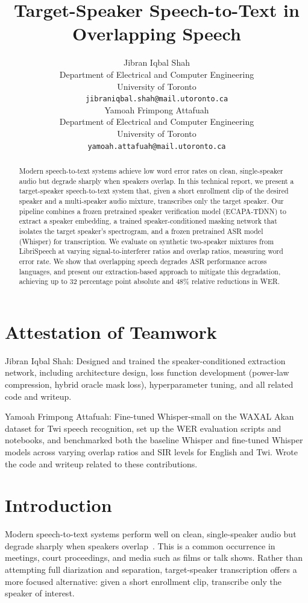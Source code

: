\documentclass{article}
\title{Target-Speaker Speech-to-Text in Overlapping Speech}
\author{%
  Jibran Iqbal Shah\\
  Department of Electrical and Computer Engineering\\
  University of Toronto\\
  \texttt{jibraniqbal.shah@mail.utoronto.ca} \\
  \And
  Yamoah Frimpong Attafuah\\
  Department of Electrical and Computer Engineering\\
  University of Toronto\\
  \texttt{yamoah.attafuah@mail.utoronto.ca} \\
}
\begin{document}
\maketitle


\begin{abstract}
Modern speech-to-text systems achieve low word error rates on clean, single-speaker audio but degrade sharply when speakers overlap. In this technical report, we present a target-speaker speech-to-text system that, given a short enrollment clip of the desired speaker and a multi-speaker audio mixture, transcribes only the target speaker. Our pipeline combines a frozen pretrained speaker verification model (ECAPA-TDNN) to extract a speaker embedding, a trained speaker-conditioned masking network that isolates the target speaker's spectrogram, and a frozen pretrained ASR model (Whisper) for transcription. We evaluate on synthetic two-speaker mixtures from LibriSpeech at varying signal-to-interferer ratios and overlap ratios, measuring word error rate. We show that overlapping speech degrades ASR performance across languages, and present our extraction-based approach to mitigate this degradation, achieving up to 32 percentage point absolute and 48\% relative reductions in WER.
\end{abstract}

\section*{Attestation of Teamwork}
Jibran Iqbal Shah: Designed and trained the speaker-conditioned extraction network, including architecture design, loss function development (power-law compression, hybrid oracle mask loss), hyperparameter tuning, and all related code and writeup.

Yamoah Frimpong Attafuah: Fine-tuned Whisper-small on the WAXAL Akan dataset for Twi speech recognition, set up the WER evaluation scripts and notebooks, and benchmarked both the baseline Whisper and fine-tuned Whisper models across varying overlap ratios and SIR levels for English and Twi. Wrote the code and writeup related to these contributions.


\section{Introduction}

Modern speech-to-text systems perform well on clean, single-speaker audio but degrade sharply when speakers overlap~\citep{Chime, overlap}. This is a common occurrence in meetings, court proceedings, and media such as films or talk shows. Rather than attempting full diarization and separation, target-speaker transcription offers a more focused alternative: given a short enrollment clip, transcribe only the speaker of interest.
\end{document}
